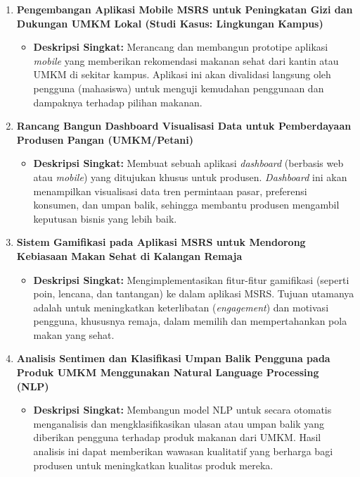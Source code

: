 \documentclass[
  letterpaper,
  DIV=11,
  numbers=noendperiod]{scrreprt}
\providecommand{\tightlist}{%
  \setlength{\itemsep}{0pt}\setlength{\parskip}{0pt}}
\begin{document}
\begin{enumerate}
\def\labelenumi{\arabic{enumi}.}
\tightlist
\item
  \textbf{Pengembangan Aplikasi Mobile MSRS untuk Peningkatan Gizi dan
  Dukungan UMKM Lokal (Studi Kasus: Lingkungan Kampus)}

  \begin{itemize}
  \tightlist
  \item
    \textbf{Deskripsi Singkat:} Merancang dan membangun prototipe
    aplikasi \emph{mobile} yang memberikan rekomendasi makanan sehat
    dari kantin atau UMKM di sekitar kampus. Aplikasi ini akan
    divalidasi langsung oleh pengguna (mahasiswa) untuk menguji
    kemudahan penggunaan dan dampaknya terhadap pilihan makanan.
  \end{itemize}
\item
  \textbf{Rancang Bangun Dashboard Visualisasi Data untuk Pemberdayaan
  Produsen Pangan (UMKM/Petani)}

  \begin{itemize}
  \tightlist
  \item
    \textbf{Deskripsi Singkat:} Membuat sebuah aplikasi \emph{dashboard}
    (berbasis web atau \emph{mobile}) yang ditujukan khusus untuk
    produsen. \emph{Dashboard} ini akan menampilkan visualisasi data
    tren permintaan pasar, preferensi konsumen, dan umpan balik,
    sehingga membantu produsen mengambil keputusan bisnis yang lebih
    baik.
  \end{itemize}
\item
  \textbf{Sistem Gamifikasi pada Aplikasi MSRS untuk Mendorong Kebiasaan
  Makan Sehat di Kalangan Remaja}

  \begin{itemize}
  \tightlist
  \item
    \textbf{Deskripsi Singkat:} Mengimplementasikan fitur-fitur
    gamifikasi (seperti poin, lencana, dan tantangan) ke dalam aplikasi
    MSRS. Tujuan utamanya adalah untuk meningkatkan keterlibatan
    (\emph{engagement}) dan motivasi pengguna, khususnya remaja, dalam
    memilih dan mempertahankan pola makan yang sehat.
  \end{itemize}
\item
  \textbf{Analisis Sentimen dan Klasifikasi Umpan Balik Pengguna pada
  Produk UMKM Menggunakan Natural Language Processing (NLP)}

  \begin{itemize}
  \tightlist
  \item
    \textbf{Deskripsi Singkat:} Membangun model NLP untuk secara
    otomatis menganalisis dan mengklasifikasikan ulasan atau umpan balik
    yang diberikan pengguna terhadap produk makanan dari UMKM. Hasil
    analisis ini dapat memberikan wawasan kualitatif yang berharga bagi
    produsen untuk meningkatkan kualitas produk mereka.
  \end{itemize}
\end{enumerate}
\end{document}
